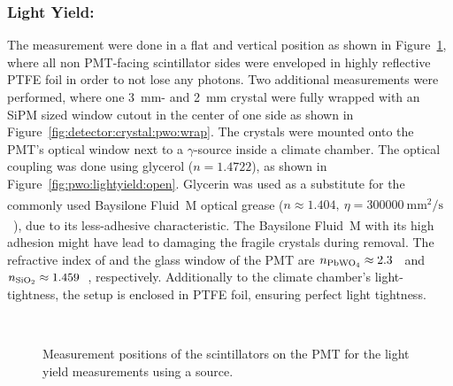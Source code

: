 \subsubsection{Light Yield: }
The  measurement were done in a flat and vertical position as shown in Figure~\ref{fig:lightyield:pwo:setup}, where all non PMT-facing scintillator sides were enveloped in highly reflective PTFE foil in order to not lose any photons.
Two additional measurements were performed, where one \SI{3}{\milli\meter}- and \SI{2}{\milli\meter} crystal were fully wrapped with an SiPM sized window cutout in the center of one side  as shown in Figure~\ref{fig:detector:crystal:pwo:wrap}.
The  crystals were mounted onto the PMT's optical window next to a  $\gamma$-source inside a climate chamber.
The optical coupling was done using glycerol ($n=1.4722$), as shown in Figure~\ref{fig:pwo:lightyield:open}.
Glycerin was used as a substitute for the commonly used Baysilone\textsuperscript{{\textregistered}} Fluid~M optical grease ($n\approx 1.404,~\eta=\SI{300000}{\milli\meter^2\per\second}$~\cite{bayer:baysilone}), due to its less-adhesive characteristic.
The Baysilone\textsuperscript{{\textregistered}} Fluid~M with its high adhesion might have lead to damaging the fragile crystals during removal.
The refractive index of  and the  glass window of the \gls{PMT} are $n_{\ce{PbWO4}}\approx2.3$~\cite{cms:tdr} and $n_{\ce{SiO2}}\approx1.459$~\cite{Malitson:65}, respectively.
Additionally to the climate chamber's light-tightness, the setup is enclosed in PTFE foil, ensuring perfect light tightness.

\begin{figure}[h]
    \centering        
    \hspace{0.02\textwidth}
    \\ 
    \caption{Measurement positions of the  scintillators on the \gls{PMT} for the light yield measurements using a  source.}\label{fig:lightyield:pwo:setup}
\end{figure}



